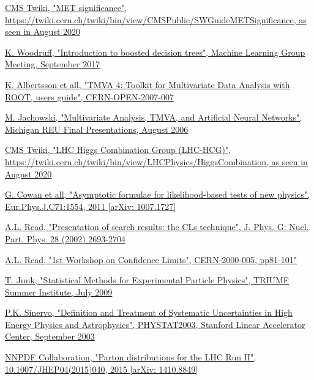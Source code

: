 \documentclass[a4paper, 10pt, openright]{report}
\begin{document}
\begin{thebibliography}{1}
\href{https://twiki.cern.ch/twiki/bin/view/CMSPublic/SWGuideMETSignificance}{\ac{CMS} Twiki, "MET significance", \url{https://twiki.cern.ch/twiki/bin/view/CMSPublic/SWGuideMETSignificance}, as seen in August 2020}

\href{https://indico.fnal.gov/event/15356/contributions/31377/attachments/19671/24560/DecisionTrees.pdf}{K. Woodruff,
"Introduction to boosted decision trees", Machine Learning Group Meeting, September 2017}

\href{https://indico.cern.ch/event/5007/contributions/1177811/attachments/962648/1366777/reu_presentation3.pdf}{K. Albertsson et all,
"TMVA 4: Toolkit for Multivariate Data Analysis with ROOT, users guide", CERN-OPEN-2007-007}

\href{https://root.cern.ch/root/htmldoc/guides/tmva/TMVAUsersGuide.pdf}{M. Jachowski,
"Multivariate Analysis, TMVA, and Artificial Neural Networks", Michigan REU Final Presentations, August 2006}

\href{https://twiki.cern.ch/twiki/bin/view/LHCPhysics/HiggsCombination}{\ac{CMS} Twiki,
"LHC Higgs Combination Group (LHC-HCG)", \url{https://twiki.cern.ch/twiki/bin/view/LHCPhysics/HiggsCombination}, as seen in August 2020}

\href{https://arxiv.org/abs/1007.1727}{G. Cowan et all,
"Asymptotic formulae for likelihood-based tests of new physics", Eur.Phys.J.C71:1554, 2011 [arXiv: 1007.1727]}

\href{https://indico.cern.ch/event/398949/attachments/799330/1095613/The\_CLs\_Technique.pdf}{A.L. Read, "Presentation of search results: the CLs technique", J. Phys. G: Nucl. Part. Phys. 28 (2002) 2693-2704}

\href{https://cds.cern.ch/record/411537/files/CERN-2000-005.pdf}{A.L. Read,
"1st Workshop on Confidence Limits", CERN-2000-005, pp81-101"}

\href{https://www-cdf.fnal.gov/~trj/tsi09/trjtsi_Day1.pdf}{T. Junk,
"Statistical Methods for Experimental Particle Physics", TRIUMF Summer Institute, July 2009}

\href{https://hep.physics.utoronto.ca/~pekka/papers/systematicsreview.pdf}{P.K. Sinervo,
"Definition and Treatment of Systematic Uncertainties in High Energy Physics and Astrophysics", PHYSTAT2003, Stanford Linear Accelerator Center, September 2003}

\href{https://arxiv.org/abs/1410.8849}{NNPDF Collaboration,
"Parton distributions for the LHC Run II", 10.1007/JHEP04(2015)040, 2015 [arXiv: 1410.8849]}


\end{thebibliography}
\end{document}
